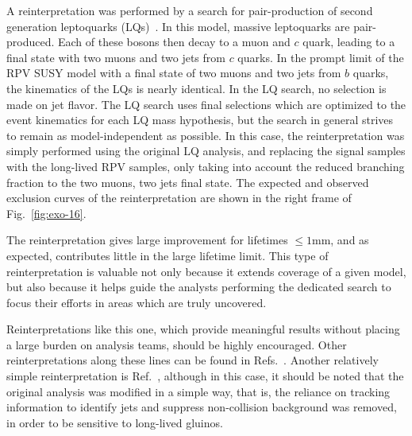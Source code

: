A reinterpretation was performed by a search for pair-production of second
generation leptoquarks (LQs)~\cite{CMS-PAS-EXO-16-007,Sirunyan:2018ryt}. In this model, massive
leptoquarks are pair-produced.  Each of these bosons then decay to a muon and
$c$ quark, leading to a final state with two muons and two jets from $c$ quarks.
In the prompt limit of the RPV SUSY model with a final state of two muons and
two jets from $b$ quarks, the kinematics of the LQs is nearly identical. In the
LQ search, no selection is made on jet flavor. The LQ search uses final
selections which are optimized to the event kinematics for each LQ mass
hypothesis, but the search in general strives to remain as model-independent as
possible. In this case, the reinterpretation was simply performed using the
original LQ analysis, and replacing the signal samples with the long-lived RPV
samples, only taking into account the reduced branching fraction to the two
muons, two jets final state. The expected and observed exclusion curves of the
reinterpretation are shown in the right frame of Fig.~\ref{fig:exo-16}.

The reinterpretation gives large improvement for lifetimes $\leq1$mm, and as
expected, contributes little in the large lifetime limit. This type of
reinterpretation is valuable not only because it extends coverage of a given
model, but also because it helps guide the analysts performing the dedicated
search to focus their efforts in areas which are truly uncovered.

Reinterpretations like this one, which provide meaningful results without
placing a large burden on analysis teams, should be highly encouraged. Other reinterpretations along
these lines can be found in Refs.~\cite{ATLAS-CONF-2014-037,Sirunyan:2018vjp,Aaboud:2018iil}. Another relatively simple
reinterpretation is Ref.~\cite{ATLAS-CONF-2018-003}, although in this case, it
should be noted that the original analysis was modified in a simple way, that is,
the reliance on tracking information to identify jets and suppress non-collision background was
removed, in order to be sensitive to long-lived gluinos.

